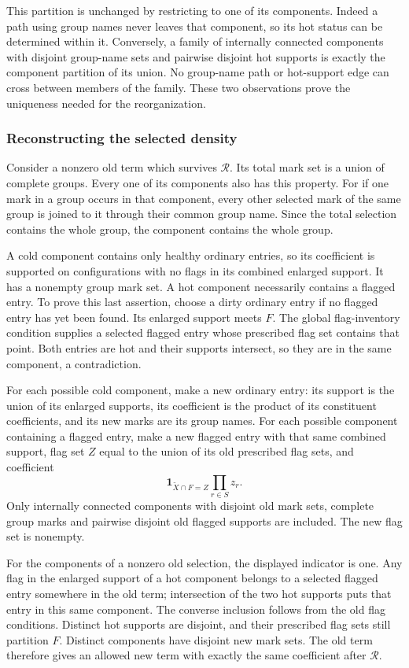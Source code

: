 This partition is unchanged by restricting to one of its components.
Indeed a path using group names never leaves that component, so its
hot status can be determined within it. Conversely, a family of
internally connected components with disjoint group-name sets and
pairwise disjoint hot supports is exactly the component partition
of its union. No group-name path or hot-support edge can cross between
members of the family. These two observations prove the uniqueness
needed for the reorganization.

\subsubsection{Reconstructing the selected density}
Consider a nonzero old term which survives $\mathcal R$. Its total
mark set is a union of complete groups. Every one of its components
also has this property. For if one mark in a group occurs in that
component, every other selected mark of the same group is joined to
it through their common group name. Since the total selection contains
the whole group, the component contains the whole group.

A cold component contains only healthy ordinary entries, so its
coefficient is supported on configurations with no flags in its
combined enlarged support. It has a nonempty group mark set. A hot
component necessarily contains a flagged entry. To prove this last
assertion, choose a dirty ordinary entry if no flagged entry has yet
been found. Its enlarged support meets $F$. The global flag-inventory
condition supplies a selected flagged entry whose prescribed flag set
contains that point. Both entries are hot and their supports intersect,
so they are in the same component, a contradiction.

For each possible cold component, make a new ordinary entry: its
support is the union of its enlarged supports, its coefficient is
the product of its constituent coefficients, and its new marks are
its group names. For each possible component containing a flagged
entry, make a new flagged entry with that same combined support,
flag set $Z$ equal to the union of its old prescribed flag sets,
and coefficient
\[
 \boldsymbol1_{\widetilde X\cap F=Z}\prod_{r\in S}z_r.
\]
Only internally connected components with disjoint old mark sets,
complete group marks and pairwise disjoint old flagged supports are
included. The new flag set is nonempty.

For the components of a nonzero old selection, the displayed indicator
is one. Any flag in the enlarged support of a hot component belongs
to a selected flagged entry somewhere in the old term; intersection
of the two hot supports puts that entry in this same component.
The converse inclusion follows from the old flag conditions.
Distinct hot supports are disjoint, and their prescribed flag sets
still partition $F$. Distinct components have disjoint new mark sets.
The old term therefore gives an allowed new term with exactly the
same coefficient after $\mathcal R$.

